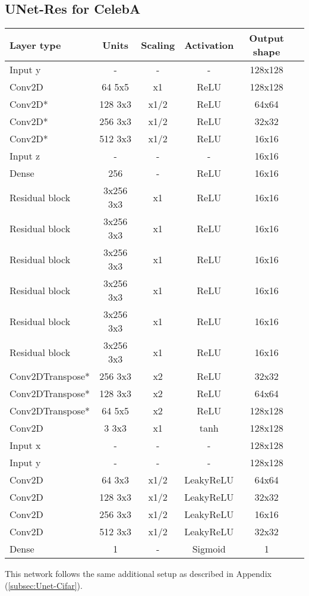 \subsection{UNet-Res for CelebA}
\label{subsec:unet_celeba}
\begin{table*}[!h]
	\centering
	\begin{tabular}{|l|c|c|c|c|c|}
		\hline
		Layer type & Units & Scaling & Activation & Output shape\\
		\hline
		Input y & - & - & - & 128x128\\
		Conv2D & 64 5x5 & x1 & ReLU & 128x128 \\
		Conv2D* & 128 3x3 & x1/2 & ReLU & 64x64 \\
		Conv2D* & 256 3x3 & x1/2 & ReLU & 32x32 \\
		Conv2D* & 512 3x3 & x1/2 & ReLU & 16x16 \\
		Input z & - & - & - & 16x16\\
		Dense & 256 & - & ReLU & 16x16\\
		Residual block & 3x256 3x3 & x1 & ReLU & 16x16 \\
		Residual block & 3x256 3x3 & x1 & ReLU & 16x16 \\
		Residual block & 3x256 3x3 & x1 & ReLU & 16x16 \\
		Residual block & 3x256 3x3 & x1 & ReLU & 16x16 \\
		Residual block & 3x256 3x3 & x1 & ReLU & 16x16 \\
		Residual block & 3x256 3x3 & x1 & ReLU & 16x16 \\
		Conv2DTranspose* & 256 3x3 & x2 & ReLU & 32x32 \\
		Conv2DTranspose* & 128 3x3 & x2 & ReLU & 64x64 \\
		Conv2DTranspose* & 64 5x5 & x2 & ReLU & 128x128 \\
		Conv2D & 3 3x3 & x1 & tanh & 128x128 \\
		\hline
		Input x & - & - & - & 128x128\\
		Input y & - & - & - & 128x128\\
		Conv2D & 64 3x3 & x1/2 & LeakyReLU & 64x64 \\
		Conv2D & 128 3x3 & x1/2 & LeakyReLU & 32x32 \\
		Conv2D & 256 3x3 & x1/2 & LeakyReLU & 16x16 \\
		Conv2D & 512 3x3 & x1/2 & LeakyReLU & 32x32 \\
		Dense & 1 & - & Sigmoid & 1\\
		\hline
	\end{tabular}
\end{table*}
\noindent
This network follows the same additional setup as described in Appendix (\ref{subsec:Unet-Cifar}).


